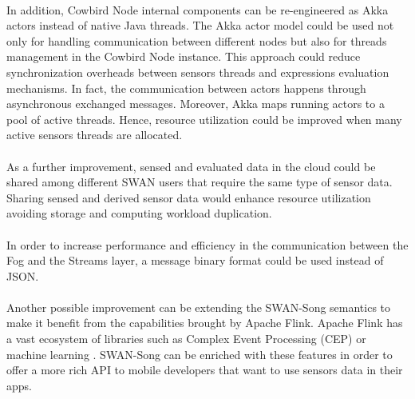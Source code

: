 \paragraph{}
In addition, Cowbird Node internal components can be re-engineered as Akka actors instead of native Java threads. The Akka actor model could be used not only for handling communication between different nodes but also for threads management in the Cowbird Node instance. This approach could reduce synchronization overheads between sensors threads and expressions evaluation mechanisms. In fact, the communication between actors happens through asynchronous exchanged messages. Moreover, Akka maps running actors to a pool of active threads. Hence, resource utilization could be improved when many active sensors threads are allocated.
\paragraph{}
As a further improvement, sensed and evaluated data in the cloud could be shared among different SWAN users that require the same type of sensor data. Sharing sensed and derived sensor data would enhance resource utilization avoiding storage and computing workload duplication.
\paragraph{}
In order to increase performance and efficiency in the communication between the Fog and the Streams layer, a message binary format could be used instead of JSON.
\paragraph{}
Another possible improvement can be extending the SWAN-Song semantics to make it benefit from the capabilities brought by Apache Flink. Apache Flink has a vast ecosystem of libraries such as Complex Event Processing (CEP) \cite{flinkceponline} or machine learning \cite{flinkmlonline}. SWAN-Song can be enriched with these features in order to offer a more rich API to mobile developers that want to use sensors data in their apps. 





 